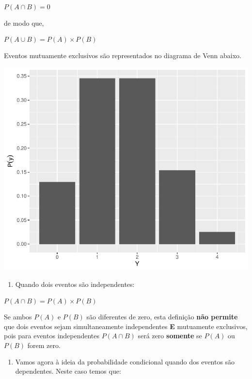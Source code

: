 \documentclass[
]{book}
\providecommand{\tightlist}{%
  \setlength{\itemsep}{0pt}\setlength{\parskip}{0pt}}
\begin{document}
\(P(A \cap B) = 0\)

de modo que,

\(P(A \cup B) = P(A) \times P(B)\)

Eventos mutuamente exclusivos são representados no diagrama de Venn abaixo.

\begin{center}\includegraphics{probest-cambientais_files/figure-latex/unnamed-chunk-196-1} \end{center}

\begin{enumerate}
\def\labelenumi{\arabic{enumi}.}
\setcounter{enumi}{3}
\tightlist
\item
  Quando dois eventos são independentes:
\end{enumerate}

\(P(A \cap B) = P(A) \times P(B)\)

Se ambos \(P(A)\) e \(P(B)\) são diferentes de zero, esta definição \textbf{não permite} que dois eventos sejam simultaneamente independentes \textbf{E} mutuamente exclusivos, pois para eventos independentes \(P(A \cap B)\) será zero \textbf{somente} se \(P(A)\) ou \(P(B)\) forem zero.

\begin{enumerate}
\def\labelenumi{\arabic{enumi}.}
\setcounter{enumi}{4}
\tightlist
\item
  Vamos agora à ideia da probabilidade condicional quando dos eventos são dependentes. Neste caso temos que:
\end{enumerate}
\end{document}

